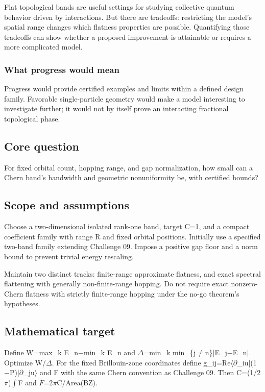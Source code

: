 \documentclass[
  11pt,
]{article}
\begin{document}
Flat topological bands are useful settings for studying collective
quantum behavior driven by interactions. But there are tradeoffs:
restricting the model's spatial range changes which flatness properties
are possible. Quantifying those tradeoffs can show whether a proposed
improvement is attainable or requires a more complicated model.

\subsubsection{What progress would mean}

Progress would provide certified examples and limits within a defined
design family. Favorable single-particle geometry would make a model
interesting to investigate further; it would not by itself prove an
interacting fractional topological phase.

\subsection{Core question}

For fixed orbital count, hopping range, and gap normalization, how small
can a Chern band's bandwidth and geometric nonuniformity be, with
certified bounds?

\subsection{Scope and assumptions}

Choose a two-dimensional isolated rank-one band, target C=1, and a
compact coefficient family with range R and fixed orbital positions.
Initially use a specified two-band family extending Challenge 09. Impose
a positive gap floor and a norm bound to prevent trivial energy
rescaling.

Maintain two distinct tracks: finite-range approximate flatness, and
exact spectral flattening with generally non-finite-range hopping. Do
not require exact nonzero-Chern flatness with strictly finite-range
hopping under the no-go theorem's hypotheses.

\subsection{Mathematical target}

Define W=max\_k E\_n\ensuremath{-}min\_k E\_n and
\ensuremath{\Delta}=min\_k
min\_\{j\ensuremath{\ne}n\}|E\_j\ensuremath{-}E\_n|. Optimize
W/\ensuremath{\Delta}. For the fixed Brillouin-zone coordinates define
g\_ij=Re\ensuremath{\langle}\ensuremath{\partial}\_iu|(1\ensuremath{-}P)|\ensuremath{\partial}\_ju\ensuremath{\rangle}
and F with the same Chern convention as Challenge 09. Then
C=(1/2\ensuremath{\pi})\ensuremath{\int}F and
\ensuremath{\bar{F}}=2\ensuremath{\pi}C/Area(BZ).
\end{document}
